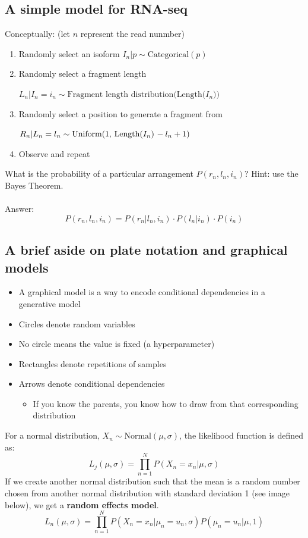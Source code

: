 \documentclass[10pt]{article}
\begin{document}
\subsection*{A simple model for RNA-seq}
Conceptually:  \hfill (let $n$ represent the read nunmber)
\begin{enumerate}[~~~~1.]
    \item Randomly select an isoform \hfill $I_n \vert p \sim \text{Categorical}(p)$
    \item Randomly select a fragment length
    \begin{flushright}\vspace{-0.2cm}$L_n \vert I_n = i_n \sim \text{Fragment length distribution(Length($I_n$))}$\end{flushright}
    \item \vspace{-0.2cm} Randomly select a position to generate a fragment from
    \begin{flushright}\vspace{-0.2cm}$R_n \vert L_n = l_n \sim \text{Uniform(1, Length($I_n$) $ -\:l_n + 1$)}$\end{flushright}
    \item \vspace{-0.2cm} Observe and repeat
\end{enumerate}
What is the probability of a particular arrangement $P(r_n, l_n, i_n)$?  Hint: use the Bayes Theorem.\\\\
Answer:
\[P(r_n, l_n, i_n) = P(r_n \vert l_n, i_n) \cdot P(l_n \vert i_n) \cdot P(i_n)\]

\subsection*{A brief aside on plate notation and graphical models}
\begin{itemize}
    \item A graphical model is a way to encode conditional dependencies in a generative model
    \item Circles denote random variables
    \item No circle means the value is fixed (a hyperparameter)
    \item Rectangles denote repetitions of samples
    \item Arrows denote conditional dependencies
    \begin{itemize}
        \item If you know the parents, you know how to draw from that corresponding distribution
    \end{itemize}
\end{itemize}
For a normal distribution, $X_n \sim \text{Normal}(\mu, \sigma)$, the likelihood function is defined as:
\[L_j(\mu, \sigma) = \prod_{n = 1}^N P(X_n = x_n \vert \mu, \sigma)\]
If we create another normal distribution such that the mean is a random number chosen from another normal distribution with standard deviation 1 (see image below), we get a \textbf{random effects model}.
\[L_n(\mu, \sigma) = \prod_{n = 1}^N P(X_n = x_n \vert \mu_n = u_n, \sigma) P(\mu_n = u_n \vert \mu, 1)\]
\end{document}
